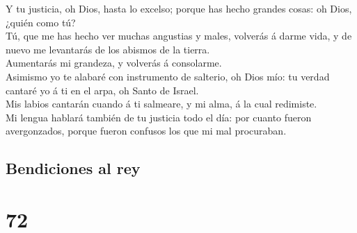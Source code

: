  Y tu justicia, oh Dios, hasta lo excelso; porque has
hecho grandes cosas: oh Dios, ¿quién como tú?\\
 Tú, que me has hecho ver muchas angustias y males,
volverás á darme vida, y de nuevo me levantarás de los abismos de la
tierra.\\
 Aumentarás mi grandeza, y volverás á consolarme.\\
 Asimismo yo te alabaré con instrumento de salterio, oh
Dios mío: tu verdad cantaré yo á ti en el arpa, oh Santo de Israel.\\
 Mis labios cantarán cuando á ti salmeare, y mi alma, á
la cual redimiste.\\
 Mi lengua hablará también de tu justicia todo el día:
por cuanto fueron avergonzados, porque fueron confusos los que mi mal
procuraban.

\hypertarget{bendiciones-al-rey}{%
\subsection{Bendiciones al rey}\label{bendiciones-al-rey}}

\hypertarget{section-71}{%
\section{72}\label{section-71}}

